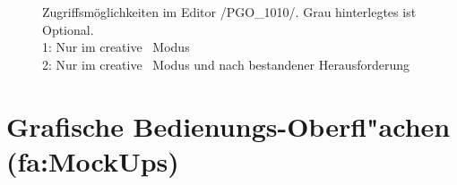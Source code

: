 	\begin{figure}[!ht]
		  \centering
		  
		  \caption{Zugriffsmöglichkeiten im Editor /PGO\_1010/. Grau hinterlegtes ist Optional.\\\hspace{\textwidth}
			1: Nur im \glqq creative\grqq~ Modus\\\hspace{\textwidth}
			2: Nur im \glqq creative\grqq~ Modus und nach bestandener Herausforderung}
	\end{figure}

	
\clearpage
%
%
%
\section{Grafische Bedienungs-Oberfl{"a}chen (\gls{fa:MockUp}s)}
	
